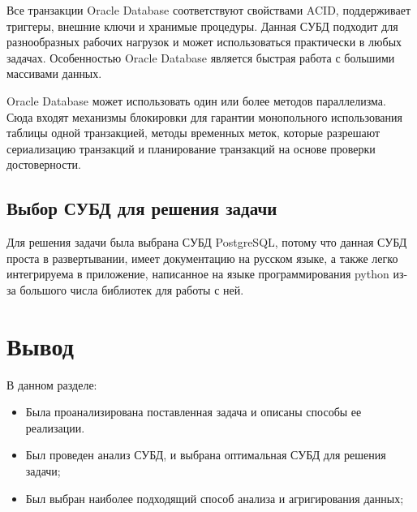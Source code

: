 Все транзакции Oracle Database соответствуют свойствами ACID, поддерживает триггеры, внешние ключи и хранимые процедуры. Данная СУБД подходит для разнообразных рабочих нагрузок и может использоваться практически в любых задачах. Особенностью Oracle Database является быстрая работа с большими массивами данных.

Oracle Database может использовать один или более методов параллелизма. Сюда входят механизмы блокировки для гарантии монопольного использования таблицы одной транзакцией, методы временных меток, которые разрешают сериализацию транзакций и планирование транзакций на основе проверки достоверности.

\subsection{Выбор СУБД для решения задачи}

Для решения задачи была выбрана СУБД PostgreSQL, потому что данная СУБД проста в развертывании, имеет документацию на русском языке, а также легко интегрируема в приложение, написанное на языке программирования python \cite{python} из-за большого числа библиотек для работы с ней.


\section*{Вывод}

В данном разделе:

\begin{itemize}
	
	\item Была проанализирована поставленная задача и описаны способы ее реализации.
	
	\item Был проведен анализ СУБД, и выбрана оптимальная СУБД для решения задачи;
	
	\item Был выбран наиболее подходящий способ анализа и агригирования данных;
	
\end{itemize}
	
 










